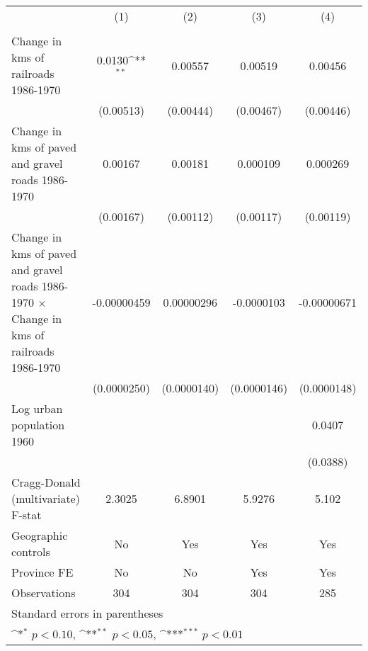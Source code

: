 {
\def\sym#1{\ifmmode^{#1}\else\(^{#1}\)\fi}
\begin{tabular}{l*{4}{c}}
\hline\hline
                &\multicolumn{1}{c}{(1)}&\multicolumn{1}{c}{(2)}&\multicolumn{1}{c}{(3)}&\multicolumn{1}{c}{(4)}\\
                &\multicolumn{1}{c}{}&\multicolumn{1}{c}{}&\multicolumn{1}{c}{}&\multicolumn{1}{c}{}\\
\hline
Change in kms of railroads 1986-1970&   0.0130\sym{**} &  0.00557         &  0.00519         &  0.00456         \\
                &(0.00513)         &(0.00444)         &(0.00467)         &(0.00446)         \\
[1em]
Change in kms of paved and gravel roads 1986-1970&  0.00167         &  0.00181         & 0.000109         & 0.000269         \\
                &(0.00167)         &(0.00112)         &(0.00117)         &(0.00119)         \\
[1em]
Change in kms of paved and gravel roads 1986-1970 $\times$ Change in kms of railroads 1986-1970&-0.00000459         &0.00000296         &-0.0000103         &-0.00000671         \\
                &(0.0000250)         &(0.0000140)         &(0.0000146)         &(0.0000148)         \\
[1em]
Log urban population 1960&                  &                  &                  &   0.0407         \\
                &                  &                  &                  & (0.0388)         \\
\hline
Cragg-Donald (multivariate) F-stat&   2.3025         &   6.8901         &   5.9276         &    5.102         \\
Geographic controls&       No         &      Yes         &      Yes         &      Yes         \\
Province FE     &       No         &       No         &      Yes         &      Yes         \\
Observations    &      304         &      304         &      304         &      285         \\
\hline\hline
\multicolumn{5}{l}{\footnotesize Standard errors in parentheses}\\
\multicolumn{5}{l}{\footnotesize \sym{*} \(p<0.10\), \sym{**} \(p<0.05\), \sym{***} \(p<0.01\)}\\
\end{tabular}
}
